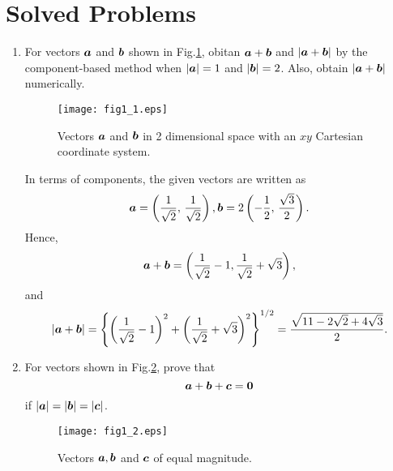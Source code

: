 \documentclass[10pt,a4j]{article}
\begin{document}
\section{Solved Problems}
\begin{enumerate}
\item
    For vectors $\mbox{\boldmath $a$}$ and $\mbox{\boldmath $b$}$ shown in Fig.\ref{fig:fig1_1}, 
    obitan $\mbox{\boldmath $a$}+\mbox{\boldmath $b$}$ and $\left| \mbox{\boldmath $a$}+\mbox{\boldmath $b$} \right|$ 
    by the component-based method when $|\mbox{\boldmath $a$}|=1$ and $|\mbox{\boldmath $b$}|=2$. Also, obtain $|\mbox{\boldmath $a$}+\mbox{\boldmath $b$}|$ numerically.
    \begin{figure}
        \begin{center}
        \texttt{[image: fig1\_1.eps]} 
        \end{center}
        \caption{Vectors $\mbox{\boldmath $a$}$ and $\mbox{\boldmath $b$}$ in 2 dimensional space with an $xy$ Cartesian coordinate system.}
        \label{fig:fig1_1}
    \end{figure}

    {\small
    In terms of components, the given vectors are written as 
    \[
        \mbox{\boldmath $a$}= \left( \frac{1}{\sqrt{2}}, \, \frac{1}{\sqrt{2}}\right), 
        \mbox{\boldmath $b$}=2 \left( -\frac{1}{2}, \, \frac{\sqrt{3}}{2}\right).
    \]
    Hence,
    \[
        \mbox{\boldmath $a$}+\mbox{\boldmath $b$}=\left( \frac{1}{\sqrt{2}}-1, \frac{1}{\sqrt{2}}+\sqrt{3}\right),
    \]
    and 
    \[
        | \mbox{\boldmath $a$}+\mbox{\boldmath $b$}| = 
        \left\{
        \left( \frac{1}{\sqrt{2}}-1\right)^2 +
        \left( \frac{1}{\sqrt{2}}+\sqrt{3}\right)^2
        \right\}^{1/2}
        =
        \frac{\sqrt{11-2\sqrt{2}+4\sqrt{3}}}{2}.
    \]
    }
\item
    For vectors shown in Fig.\ref{fig:fig1_2}, prove that 
    \[
        \mbox{\boldmath $a$}+\mbox{\boldmath $b$}+\mbox{\boldmath $c$}=\mbox{\boldmath $0$}
    \]
    if $|\mbox{\boldmath $a$}|=|\mbox{\boldmath $b$}|=|\mbox{\boldmath $c$}|$.\\
    \begin{figure}[h]
    \begin{center}
        \texttt{[image: fig1\_2.eps]} 
        \end{center}
        \caption{Vectors $\mbox{\boldmath $a$}, \mbox{\boldmath $b$}$ and $\mbox{\boldmath $c$}$ of equal magnitude.} 
        \label{fig:fig1_2}
    \end{figure}


\end{enumerate}
\end{document}
